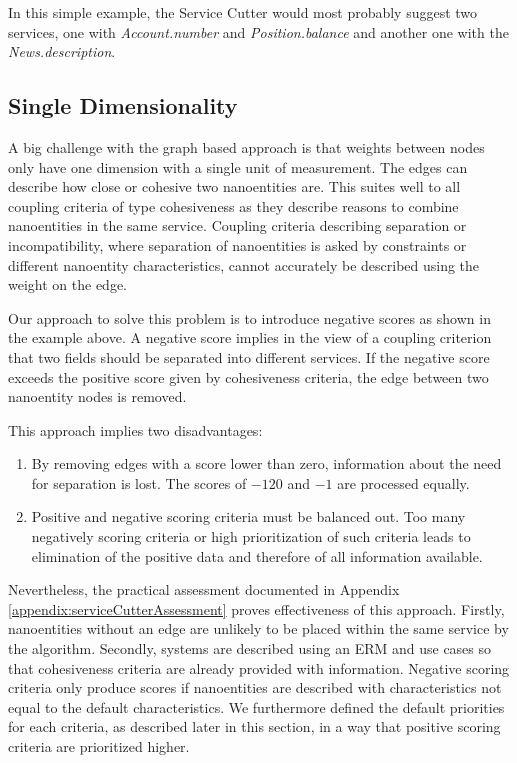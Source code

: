 In this simple example, the Service Cutter would most probably suggest two services, one with \textit{Account.number} and \textit{Position.balance} and another one with the \textit{News.description}.

\subsection{Single Dimensionality}
\label{subsec:singleDimensionality}

A big challenge with the graph based approach is that weights between nodes only have one dimension with a single unit of measurement. The edges can describe how close or cohesive two nanoentities are. This suites well to all coupling criteria of type cohesiveness as they describe reasons to combine nanoentities in the same service. Coupling criteria describing separation or incompatibility, where separation of nanoentities is asked by constraints or different nanoentity characteristics, cannot accurately be described using the weight on the edge.

Our approach to solve this problem is to introduce negative scores as shown in the example above. A negative score implies in the view of a coupling criterion that two fields should be separated into different services. If the negative score exceeds the positive score given by cohesiveness criteria, the edge between two nanoentity nodes is removed. 

This approach implies two disadvantages:

\begin{enumerate}
	\item By removing edges with a score lower than zero, information  about the need for separation is lost. The scores of $-120$ and $-1$ are processed equally. 
	\item Positive and negative scoring criteria must be balanced out. Too many negatively scoring criteria or high prioritization of such criteria leads to elimination of the positive data and therefore of all information available. 
\end{enumerate}


Nevertheless, the practical assessment documented in Appendix \ref{appendix:serviceCutterAssessment} proves effectiveness of this approach. Firstly, nanoentities without an edge are unlikely to be placed within the same service by the algorithm. Secondly, systems are described using an \gls{ERM} and use cases so that cohesiveness criteria are already provided with information. Negative scoring criteria only produce scores if nanoentities are described with characteristics not equal to the default characteristics. We furthermore defined the default priorities for each criteria, as described later in this section, in a way that positive scoring criteria are prioritized higher. 

